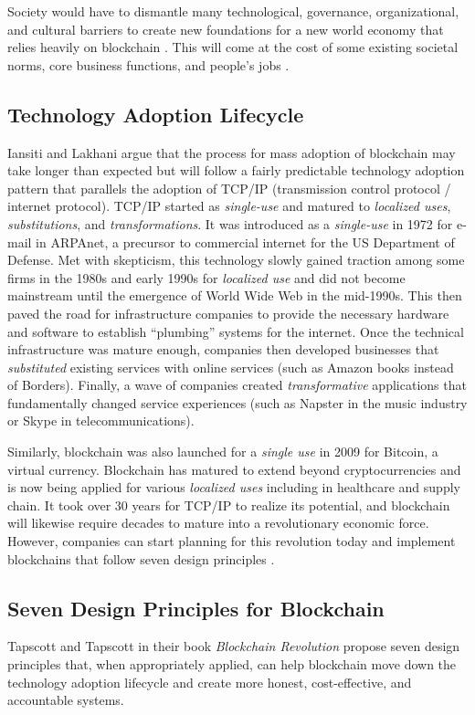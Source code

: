 \documentclass[sigconf]{acmart}
\begin{document}
Society would have to dismantle many technological, governance, organizational, and cultural barriers to create new foundations for a new world economy that relies heavily on blockchain \cite{hbr}. This will come at the cost of some existing societal norms, core business functions, and people's jobs \cite{hbr} \cite{rabah2017overview}. 

\subsection{Technology Adoption Lifecycle}
Iansiti and Lakhani \cite{hbr} argue that the process for mass adoption of blockchain may take longer than expected but will follow a fairly predictable technology adoption pattern that parallels the adoption of TCP/IP (transmission control protocol / internet protocol). TCP/IP started as \textit{single-use} and matured to \textit{localized uses}, \textit{substitutions}, and \textit{transformations}. It was introduced as a \textit{single-use} in 1972 for e-mail in ARPAnet, a precursor to commercial internet for the US Department of Defense. Met with skepticism, this technology slowly gained traction among some firms in the 1980s and early 1990s for \textit{localized use} and did not become mainstream until the emergence of World Wide Web in the mid-1990s. This then paved the road for infrastructure companies to provide the necessary hardware and software to establish ``plumbing'' systems for the internet. Once the technical infrastructure was mature enough, companies then developed businesses that \textit{substituted} existing services with online services (such as Amazon books instead of Borders). Finally, a wave of companies created \textit{transformative} applications that fundamentally changed service experiences (such as Napster in the music industry or Skype in telecommunications).

Similarly, blockchain was also launched for a \textit{single use} in 2009 for Bitcoin, a virtual currency. Blockchain has matured to extend beyond cryptocurrencies and is now being applied for various \textit{localized uses} including in healthcare and supply chain. It took over 30 years for TCP/IP to realize its potential, and blockchain will likewise require decades to mature into a revolutionary economic force. However, companies can start planning for this revolution today and implement blockchains that follow seven design principles \cite{hbr} \cite{tapscott}.

\subsection{Seven Design Principles for Blockchain}
Tapscott and Tapscott \cite{tapscott} in their book \textit{Blockchain Revolution} propose seven design principles that, when appropriately applied, can help blockchain move down the technology adoption lifecycle and create more honest, cost-effective, and accountable systems.
\end{document}
